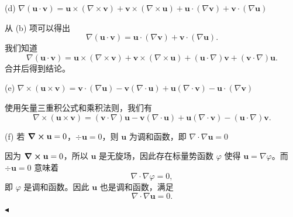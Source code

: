 \documentclass[11pt]{article}
\newenvironment{question}[2][Question]{\begin{trivlist}
\item[\hskip \labelsep {\bfseries #1}\hskip \labelsep {\bfseries #2.}]}{\hfill$\blacktriangleleft$\end{trivlist}}
\begin{document}
\begin{question}{1 (42') (矢量微分恒等式)}
         (d) \(\nabla(\textbf{u}\cdot\textbf{v})=\textbf{u}\times(\nabla\times\textbf{v})+\textbf{v}\times(\nabla\times\textbf{u})+\textbf{u}\cdot(\nabla\textbf{v})+\textbf{v}\cdot(\nabla\textbf{u})\)
        
        从 (b) 项可以得出
        \[
        \nabla (\textbf{u} \cdot \textbf{v}) = \textbf{u} \cdot (\nabla \textbf{v}) + \textbf{v} \cdot (\nabla \textbf{u}).
        \]
        我们知道
        \[
        \nabla(\textbf{u}\cdot\textbf{v}) = \textbf{u} \times (\nabla \times \textbf{v}) + \textbf{v} \times (\nabla \times \textbf{u}) + (\textbf{u} \cdot \nabla) \textbf{v} + (\textbf{v} \cdot \nabla) \textbf{u}.
        \]
        合并后得到结论。
        
         (e) \(\nabla\times(\textbf{u}\times\textbf{v}) = \textbf{v}\cdot(\nabla\textbf{u})-\textbf{v}(\nabla\cdot\textbf{u})+\textbf{u}(\nabla\cdot\textbf{v})-\textbf{u}\cdot(\nabla\textbf{v})\)
        
        使用矢量三重积公式和乘积法则，我们有
        \[
        \nabla \times (\textbf{u} \times \textbf{v}) = (\textbf{v} \cdot \nabla) \textbf{u} - \textbf{v} (\nabla \cdot \textbf{u}) + \textbf{u} (\nabla \cdot \textbf{v}) - (\textbf{u} \cdot \nabla) \textbf{v}.
        \]
        
         (f) 若 \(\curl\textbf{u}=0\)，\(\div\textbf{u}=0\)，则 \(\textbf{u}\) 为调和函数，即 \(\nabla\cdot\nabla\textbf{u}=0\)
        
        因为 \(\curl \textbf{u} = 0\)，所以 \(\textbf{u}\) 是无旋场，因此存在标量势函数 \(\varphi\) 使得 \(\textbf{u} = \nabla \varphi\)。而 \(\div \textbf{u} = 0\) 意味着
        \[
        \nabla \cdot \nabla \varphi = 0,
        \]
        即 \(\varphi\) 是调和函数。因此 \(\textbf{u}\) 也是调和函数，满足
        \[
        \nabla \cdot \nabla \textbf{u} = 0.
        \]
        
    
    \end{question}
\end{document}
